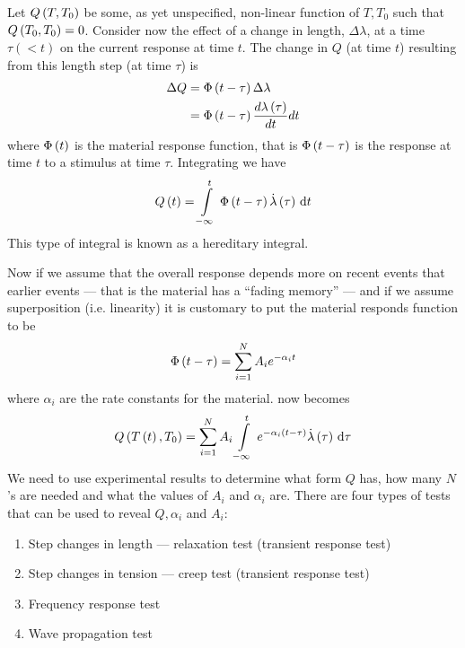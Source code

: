 Let $ Q\left( T,T_{0} \right) $ be some, as yet unspecified, non-linear function of
$T,T_{0}$ such that $ Q\left( T_{0},T_{0} \right) =0$. Consider now the effect of a
change in length, $\Delta\lambda$, at a time $\tau (< t)$ on the current
response at time $t$. The change in $Q$ (at time $t$) resulting from this length
step (at time $\tau$) is
\begin{equation*}
  \begin{split}
    \Delta Q &=  \Phi\left( t-\tau \right) \Delta\lambda \\
    &=  \Phi\left( t-\tau \right)  \dfrac{ d  \lambda\left( \tau \right) }{d t} dt
  \end{split}
\end{equation*}
where $ \Phi\left( t \right) $ is the material response function, that is
$ \Phi\left( t-\tau \right) $ is the response at time $t$ to a stimulus at time
$\tau$. Integrating we have
\begin{equation}
  \fnof{Q}{t}=\gint{-\infty}{t}{\fnof{\Phi}{t-\tau}\fnof{\dot{\lambda}}{\tau}}
  {t}
  \label{eqn:hereditaryintegral}
\end{equation}
This type of integral is known as a hereditary integral.

Now if we assume that the overall response depends more on recent events that
earlier events --- that is the material has a ``fading memory'' --- and if we
assume superposition (i.e. linearity) it is customary to put the material
responds function to be
\begin{equation}
   \Phi\left( t-\tau \right) = \displaystyle\sum _{i=1}^{N}A_{i}e^{-\alpha_{i}t}
\end{equation}
where $\alpha_{i}$ are the rate constants for the
material.  now becomes
\begin{equation}
  \fnof{Q}{\fnof{T}{t},T_{0}}=\dsum_{i=1}^{N}A_{i}\gint{-\infty}{t}{
    e^{-\alpha_{i}\pbrac{t-\tau}}\fnof{\dot{\lambda}}{\tau}}{\tau}
\end{equation}
We need to use experimental results to determine what form $Q$ has, how many
$N$'s are needed and what the values of $A_{i}$ and $\alpha_{i}$ are. There
are four types of tests that can be used to reveal $Q,\alpha_{i}$ and $A_{i}$:
\begin{enumerate}
\item Step changes in length --- relaxation test (transient response test)
\item Step changes in tension --- creep test (transient response test)
\item Frequency response test
\item Wave propagation test
\end{enumerate}

